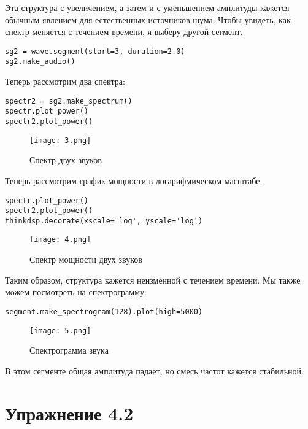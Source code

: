 \documentclass[a4paper,12pt]{report}
\begin{document}
Эта структура с увеличением, а затем и с уменьшением амплитуды кажется обычным явлением для естественных источников шума. Чтобы увидеть, как спектр меняется с течением времени, я выберу другой сегмент.

\begin{lstlisting}[caption=Выбор другого сегмента звука]
sg2 = wave.segment(start=3, duration=2.0)
sg2.make_audio()
\end{lstlisting}

Теперь рассмотрим два спектра:

\begin{lstlisting}[caption=Спектр двух звуков]
spectr2 = sg2.make_spectrum()
spectr.plot_power()
spectr2.plot_power()
\end{lstlisting}

\begin{figure}[H]
        \centering
        \texttt{[image: 3.png]}
        \caption{Спектр двух звуков}
        \label{fig:lab4_fig1_3}
\end{figure}

Теперь рассмотрим график мощности в логарифмическом масштабе.

\begin{lstlisting}[caption=Спектр мощности двух звуков]
spectr.plot_power()
spectr2.plot_power()
thinkdsp.decorate(xscale='log', yscale='log')
\end{lstlisting}

\begin{figure}[H]
        \centering
        \texttt{[image: 4.png]}
        \caption{Спектр мощности двух звуков}
        \label{fig:lab4_fig1_4}
\end{figure}

Таким образом, структура кажется неизменной с течением времени. Мы также можем посмотреть на спектрограмму:

\begin{lstlisting}[caption=Спектрограмма звука]
segment.make_spectrogram(128).plot(high=5000)
\end{lstlisting}

\begin{figure}[H]
        \centering
        \texttt{[image: 5.png]}
        \caption{Спектрограмма звука}
        \label{fig:lab4_fig1_5}
\end{figure}

В этом сегменте общая амплитуда падает, но смесь частот кажется стабильной.

\chapter{Упражнение 4.2}
\end{document}
